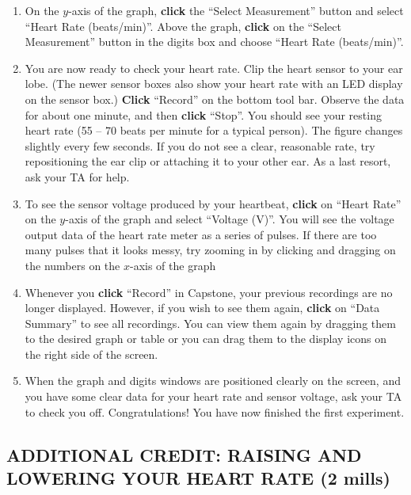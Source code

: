 \begin{enumerate}[label=\arabic*.]
\item On the \(y\)-axis of the graph, \textbf{click} the ``Select Measurement'' button and select ``Heart Rate (beats/min)''.  Above the graph, \textbf{click} on the ``Select Measurement'' button in the digits box and choose ``Heart Rate (beats/min)''.

\item You are now ready to check your heart rate.  Clip the heart sensor to your ear lobe.  (The newer sensor boxes also show your heart rate with an LED display on the sensor box.)  \textbf{Click} ``Record'' on the bottom tool bar.  Observe the data for about one minute, and then \textbf{click} ``Stop''.  You should see your resting heart rate (55 -- 70 beats per minute for a typical person).  The figure changes slightly every few seconds.  If you do not see a clear, reasonable rate, try repositioning the ear clip or attaching it to your other ear.  As a last resort, ask your TA for help.

\item To see the sensor voltage produced by your heartbeat, \textbf{click} on ``Heart Rate'' on the \(y\)-axis of the graph and select ``Voltage (V)''.  You will see the voltage output data of the heart rate meter as a series of pulses.  If there are too many pulses that it looks messy, try zooming in by clicking and dragging on the numbers on the \(x\)-axis of the graph

\item Whenever you \textbf{click} ``Record'' in Capstone, your previous recordings are no longer displayed.  However, if you wish to see them again, \textbf{click} on ``Data Summary'' to see all recordings.  You can view them again by dragging them to the desired graph or table or you can drag them to the display icons on the right side of the screen.

\item When the graph and digits windows are positioned clearly on the screen, and you have some clear data for your heart rate and sensor voltage, ask your TA to check you off.  Congratulations!  You have now finished the first experiment.

\end{enumerate}

\subsection*{ADDITIONAL CREDIT: RAISING AND LOWERING YOUR HEART RATE (2 mills)}


